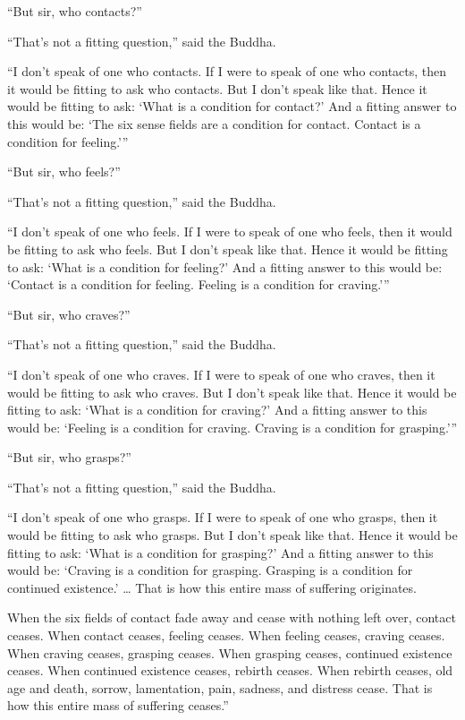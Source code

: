 \documentclass[12pt,openany]{book}%
\begin{document}
“But sir, who contacts?” 

“That’s not a fitting question,” said the Buddha. 

“I don’t speak of one who contacts. If I were to speak of one who contacts, then it would be fitting to ask who contacts. But I don’t speak like that. Hence it would be fitting to ask: ‘What is a condition for contact?’ And a fitting answer to this would be: ‘The six sense fields are a condition for contact. Contact is a condition for feeling.’” 

“But sir, who feels?” 

“That’s not a fitting question,” said the Buddha. 

“I don’t speak of one who feels. If I were to speak of one who feels, then it would be fitting to ask who feels. But I don’t speak like that. Hence it would be fitting to ask: ‘What is a condition for feeling?’ And a fitting answer to this would be: ‘Contact is a condition for feeling. Feeling is a condition for craving.’” 

“But sir, who craves?” 

“That’s not a fitting question,” said the Buddha. 

“I don’t speak of one who craves. If I were to speak of one who craves, then it would be fitting to ask who craves. But I don’t speak like that. Hence it would be fitting to ask: ‘What is a condition for craving?’ And a fitting answer to this would be: ‘Feeling is a condition for craving. Craving is a condition for grasping.’” 

“But sir, who grasps?” 

“That’s not a fitting question,” said the Buddha. 

“I don’t speak of one who grasps. If I were to speak of one who grasps, then it would be fitting to ask who grasps. But I don’t speak like that. Hence it would be fitting to ask: ‘What is a condition for grasping?’ And a fitting answer to this would be: ‘Craving is a condition for grasping. Grasping is a condition for continued existence.’ … That is how this entire mass of suffering originates. 

When the six fields of contact fade away and cease with nothing left over, contact ceases. When contact ceases, feeling ceases. When feeling ceases, craving ceases. When craving ceases, grasping ceases. When grasping ceases, continued existence ceases. When continued existence ceases, rebirth ceases. When rebirth ceases, old age and death, sorrow, lamentation, pain, sadness, and distress cease. That is how this entire mass of suffering ceases.” 
\end{document}

